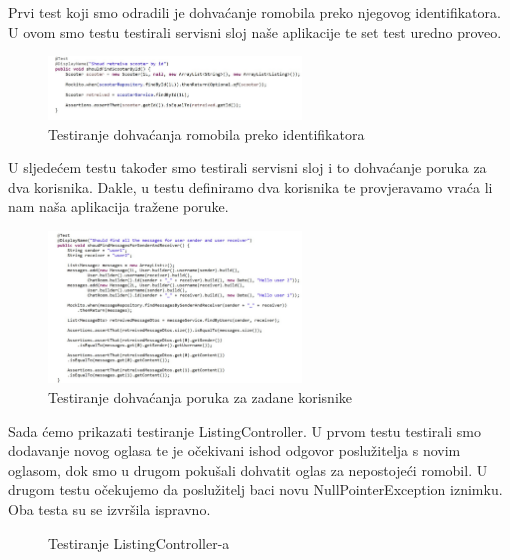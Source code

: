 			Prvi test koji smo odradili je dohvaćanje romobila preko njegovog identifikatora. U ovom smo testu testirali servisni sloj naše aplikacije te set test uredno proveo.
			\begin{figure}[h]
				\centering
				\includegraphics[width=0.6\textwidth]{slike/scooter_service_test.jpg}
				\caption{Testiranje dohvaćanja romobila preko identifikatora}
				\label{fig:Testiranje dohvaćanja romobila preko identifikatora}
			\end{figure}
			
			U sljedećem testu također smo testirali servisni sloj i to dohvaćanje poruka za dva korisnika. Dakle, u testu definiramo dva korisnika te provjeravamo vraća li nam naša aplikacija tražene poruke.
			\begin{figure}[h]
				\centering
				\includegraphics[width=0.6\textwidth]{slike/message_service_test.jpg}
				\caption{Testiranje dohvaćanja poruka za zadane korisnike}
				\label{fig:Testiranje dohvaćanja poruka za zadane korisnike}
			\end{figure}
			
			Sada ćemo prikazati testiranje ListingController. U prvom testu testirali smo dodavanje novog oglasa te je očekivani ishod odgovor poslužitelja s novim oglasom, dok smo u drugom pokušali dohvatit oglas za nepostojeći romobil. U drugom testu očekujemo da poslužitelj baci novu NullPointerException iznimku. Oba testa su se izvršila ispravno. \newline
			
			  \begin{figure}
					  	\centering
					  	\caption{Testiranje ListingController-a}
					  	\label{fig:Testiranje ListingController-a}
			  \end{figure}
			  
